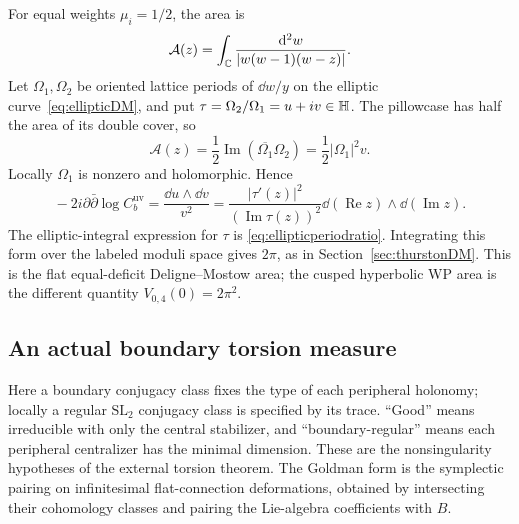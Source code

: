 For equal weights $\mu_i=1/2$, the area is
\begin{equation}
 \mathcal A(z)=\int_{\mathbb C}\frac{\mathop{}\!\mathrm d^2w}{|w(w-1)(w-z)|}.
 \label{eq:fourpointareaintegral}
\end{equation}
Let $\Omega_1,\Omega_2$ be oriented lattice periods of
$\dd w/y$ on the elliptic curve~\eqref{eq:ellipticDM}, and put
$\tau=\Omega_2/\Omega_1=u+iv\in\mathbb H$. The pillowcase has
half the area of its double cover, so
\[
 \mathcal A(z)=\frac12\operatorname{Im}
       (\overline{\Omega_1}\Omega_2)
             =\frac12|\Omega_1|^2v.
\]
Locally $\Omega_1$ is nonzero and holomorphic. Hence
\begin{equation}
 \boxed{\quad
 -2i\partial\bar\partial\log C_b^{\mathrm{uv}}
    =\frac{\dd u\wedge\dd v}{v^2}
    =\frac{|\tau'(z)|^2}{(\operatorname{Im}\tau(z))^2}
                         \dd(\operatorname{Re}z)\wedge
                         \dd(\operatorname{Im}z).
 \quad}
 \label{eq:fourpointquantumDMdensity}
\end{equation}
The elliptic-integral expression for $\tau$ is
\eqref{eq:ellipticperiodratio}. Integrating this form over the
labeled moduli space gives $2\pi$, as in
Section~\ref{sec:thurstonDM}. This is the flat equal-deficit
Deligne--Mostow area; the cusped hyperbolic WP area is the
different quantity $V_{0,4}(0)=2\pi^2$.

\subsection{An actual boundary torsion measure}

Here a boundary conjugacy class fixes the type of each peripheral
holonomy; locally a regular $\mathrm{SL}_2$ conjugacy class is
specified by its trace. ``Good'' means irreducible with only the
central stabilizer, and ``boundary-regular'' means each peripheral
centralizer has the minimal dimension. These are the nonsingularity
hypotheses of the external torsion theorem. The Goldman form is
the symplectic pairing on infinitesimal flat-connection deformations,
obtained by intersecting their cohomology classes and pairing the
Lie-algebra coefficients with $B$.

